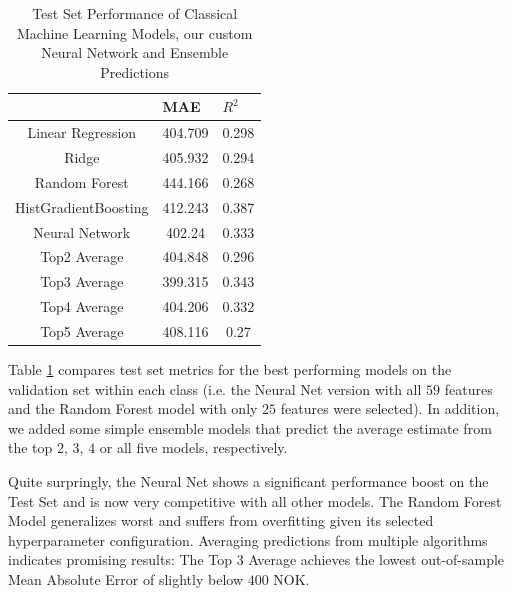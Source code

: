 \documentclass[12pt, letterpaper]{article}
\begin{document}
\begin{table}[t]
    \centering
    \begin{tabular}{@{}ccc@{}}
        \toprule
        \multicolumn{1}{l}{} & \multicolumn{1}{l}{MAE} & \multicolumn{1}{l}{\textbf{$R^2$}} \\ \midrule
        Linear Regression    & 404.709                 & 0.298                              \\
        Ridge                & 405.932                 & 0.294                              \\
        Random Forest        & 444.166                 & 0.268                              \\
        HistGradientBoosting & 412.243                 & 0.387                              \\
        Neural Network       & 402.24                  & 0.333                              \\
        Top2 Average         & 404.848                 & 0.296                              \\
        Top3 Average         & 399.315                 & 0.343                              \\
        Top4 Average         & 404.206                 & 0.332                              \\
        Top5 Average         & 408.116                 & 0.27                               \\ \bottomrule
    \end{tabular}
    \caption{Test Set Performance of Classical Machine Learning Models, our custom Neural Network and Ensemble Predictions}
    \label{tab:test-set}
\end{table}

Table \ref{tab:test-set} compares test set metrics for the best performing models on the validation set within each class (i.e. the Neural Net version with all $59$ features and the Random Forest model with only $25$ features were selected).
In addition, we added some simple ensemble models that predict the average estimate from the top $2$, $3$, $4$ or all five models, respectively.

Quite surpringly, the Neural Net shows a significant performance boost on the Test Set and is now very competitive with all other models.
The Random Forest Model generalizes worst and suffers from overfitting given its selected hyperparameter configuration.
Averaging predictions from multiple algorithms indicates promising results:
The Top $3$ Average achieves the lowest out-of-sample Mean Absolute Error of slightly below $400$ NOK.
\end{document}
